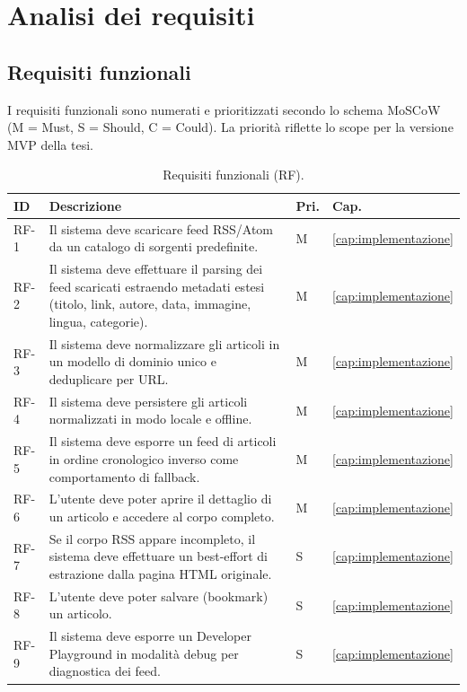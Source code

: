 \chapter{Analisi dei requisiti}
\label{cap:requisiti}

\section{Requisiti funzionali}
I requisiti funzionali sono numerati e prioritizzati secondo lo schema
MoSCoW~\cite{dsdm2014moscow} (M = Must, S = Should, C = Could). La priorità riflette lo scope per la
versione MVP della tesi.

\begin{table}[h]
\centering
\small
\caption{Requisiti funzionali (RF).}
\label{tab:rf}
\begin{tabular}{p{1.2cm}p{10cm}p{1cm}p{1.5cm}}
\toprule
\textbf{ID} & \textbf{Descrizione} & \textbf{Pri.} & \textbf{Cap.} \\
\midrule
RF-1  & Il sistema deve scaricare feed RSS/Atom da un catalogo di sorgenti predefinite. & M & \ref{cap:implementazione} \\
RF-2  & Il sistema deve effettuare il parsing dei feed scaricati estraendo metadati estesi (titolo, link, autore, data, immagine, lingua, categorie). & M & \ref{cap:implementazione} \\
RF-3  & Il sistema deve normalizzare gli articoli in un modello di dominio unico e deduplicare per URL. & M & \ref{cap:implementazione} \\
RF-4  & Il sistema deve persistere gli articoli normalizzati in modo locale e offline. & M & \ref{cap:implementazione} \\
RF-5  & Il sistema deve esporre un feed di articoli in ordine cronologico inverso come comportamento di fallback. & M & \ref{cap:implementazione} \\
RF-6  & L'utente deve poter aprire il dettaglio di un articolo e accedere al corpo completo. & M & \ref{cap:implementazione} \\
RF-7  & Se il corpo RSS appare incompleto, il sistema deve effettuare un best-effort di estrazione dalla pagina HTML originale. & S & \ref{cap:implementazione} \\
RF-8  & L'utente deve poter salvare (bookmark) un articolo. & S & \ref{cap:implementazione} \\
RF-9  & Il sistema deve esporre un Developer Playground in modalità debug per diagnostica dei feed. & S & \ref{cap:implementazione} \\

\end{tabular}
\end{table}
